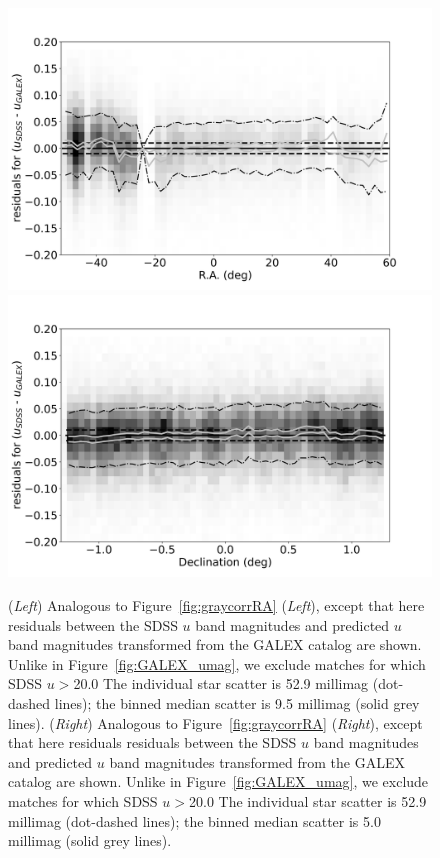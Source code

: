 \documentclass[fleqn,usenatbib]{mnras}
\begin{document}
\begin{figure}
    \centering\includegraphics[width=0.95\columnwidth]{figures/colorResidGALEXbright_du_est_RA_Hess.png}
    \centering\includegraphics[width=0.95\columnwidth]{figures/colorResidGALEXbright_du_est_Dec_Hess.png}
\caption{({\it Left}) Analogous to Figure~\ref{fig:graycorrRA} ({\it Left}), except that here
  residuals between the SDSS $u$ band magnitudes and
  predicted $u$ band magnitudes transformed from the GALEX catalog are
  shown.  Unlike in Figure~\ref{fig:GALEX_umag}, we exclude matches for
  which SDSS $u$$>$20.0 The individual star scatter is 52.9 millimag
  (dot-dashed lines); the binned median scatter is 9.5 millimag (solid
  grey lines). ({\it Right}) Analogous to Figure~\ref{fig:graycorrRA} ({\it Right}), except that here
  residuals residuals between the SDSS $u$ band magnitudes and
  predicted $u$ band magnitudes transformed from the GALEX catalog are
  shown.  Unlike in Figure~\ref{fig:GALEX_umag}, we exclude matches
  for which SDSS $u$$>$20.0 The individual star scatter is 52.9
  millimag (dot-dashed lines); the binned median scatter is 5.0
  millimag (solid grey lines). 
}
\label{fig:GALEX_RA}
\end{figure}
\end{document}
